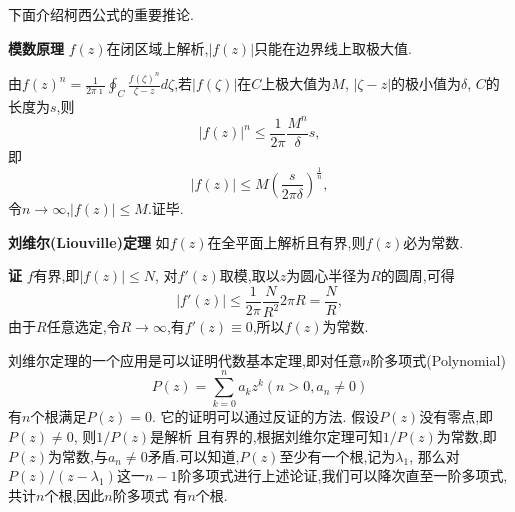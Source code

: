 下面介绍柯西公式的重要推论.

\textbf{模数原理} $f(z)$在闭区域上解析,$|f(z)|$只能在边界线上取极大值.

由$f(z)^n = \frac{1}{2\pi \imath} \oint_C \frac{f(\zeta)^n}{\zeta - z} d \zeta$,若$|f(\zeta)|$在$C$上极大值为$M$,
$|\zeta - z|$的极小值为$\delta$, $C$的长度为$s$,则
\[
  |f(z)|^n \leq \frac{1}{2\pi} \frac{M^n}{\delta} s  ,
\]
即
\[
    |f(z)| \leq M \left( \frac{s}{2\pi \delta} \right)^{\frac{1}{n}},
\]
令$n\to \infty$,$|f(z)| \leq M$.证毕.

\textbf{刘维尔(Liouville)定理} \quad 如$f(z)$在全平面上解析且有界,则$f(z)$必为常数.

\textbf{证} \quad $f$有界,即$|f(z)| \leq N$, 对$f'(z)$取模,取以$z$为圆心半径为$R$的圆周,可得
\[
  |f'(z)| \leq \frac{1}{2\pi} \frac{N} {R^2} 2\pi R = \frac{N}{R},
\]
由于$R$任意选定,令$R\to \infty$,有$f'(z) \equiv 0$,所以$f(z)$为常数.

刘维尔定理的一个应用是可以证明代数基本定理,即对任意$n$阶多项式(Polynomial)
\begin{equation}
    P(z) = \sum_{k=0}^{n} a_k z^k (n>0, a_n \neq 0)
    \label{eq:poly}
\end{equation}
有$n$个根满足$P(z) = 0$. 它的证明可以通过反证的方法. 假设$P(z)$没有零点,即$P(z)\neq 0$, 则$1/P(z)$是解析
且有界的,根据刘维尔定理可知$1/P(z)$为常数,即$P(z)$为常数,与$a_n\neq 0$矛盾.可以知道,$P(z)$至少有一个根,记为$\lambda_1$,
那么对$P(z)/(z-\lambda_1)$这一$n-1$阶多项式进行上述论证,我们可以降次直至一阶多项式,共计$n$个根,因此$n$阶多项式
有$n$个根.
